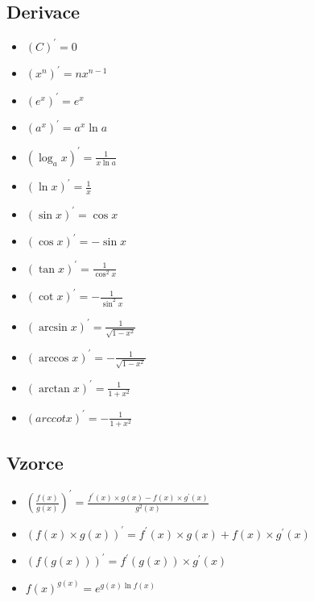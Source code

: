 \documentclass{article}
\providecommand{\arccot}{arccot}
\begin{document}
\begin{multicols}{2}
\section{Derivace}
\begin{itemize}
    \item $\left(C\right)^{\prime}=0$
    \item $\left(x^{n}\right)^{\prime}=nx^{n-1}$
    \item $\left(e^{x}\right)^{\prime}=e^{x}$
    \item $\left(a^{x}\right)^{\prime}=a^{x}\ln a$
    \item $\left(\log_{a}x\right)^{\prime}=\frac{1}{x\ln a}$
    \item $\left(\ln x\right)^{\prime}=\frac{1}{x}$
    \item $\left(\sin x\right)^{\prime}=\cos x$
    \item $\left(\cos x\right)^{\prime}=-\sin x$
    \item $\left(\tan x\right)^{\prime}=\frac{1}{\cos^{2}x}$
    \item $\left(\cot x\right)^{\prime}=-\frac{1}{\sin^{2}x}$
    \item $\left(\arcsin x\right)^{\prime}=\frac{1}{\sqrt{1-x^{2}}}$
    \item $\left(\arccos x\right)^{\prime}=-\frac{1}{\sqrt{1-x^{2}}}$
    \item $\left(\arctan x\right)^{\prime}=\frac{1}{1+x^{2}}$
    \item $\left(\arccot x\right)^{\prime}=-\frac{1}{1+x^{2}}$
\end{itemize}
\subsection{Vzorce}
\begin{itemize}
    \item $\left(\frac{f\left(x\right)}{g\left(x\right)}\right)^{\prime}=\frac{f^{\prime}\left(x\right)\times g\left(x\right)-f\left(x\right)\times g^{\prime}\left(x\right)}{g^{2}\left(x\right)}$
    \item $\left(f\left(x\right)\times g\left(x\right)\right)^{\prime}=f^{\prime}\left(x\right)\times g\left(x\right)+f\left(x\right)\times g^{\prime}\left(x\right)$
    \item $\left(f\left(g\left(x\right)\right)\right)^{\prime}=f^{\prime}\left(g\left(x\right)\right)\times g^{\prime}\left(x\right)$
    \item $f\left(x\right)^{g\left(x\right)}=e^{g\left(x\right)\ln f\left(x\right)}$
\end{itemize}

\end{multicols}
\end{document}
